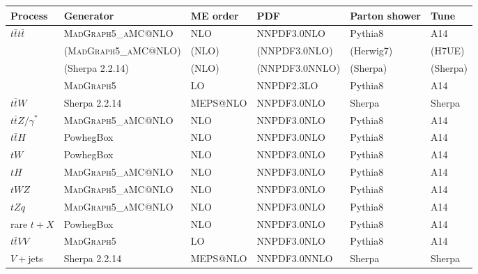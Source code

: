 \begin{table}[htbp]
\centering
\footnotesize
\setlength{\tabcolsep}{3pt}
\renewcommand{\arraystretch}{1.12}

\begin{tabular}{
p{1.6cm}
p{3.6cm}
p{1.9cm}
p{2.5cm}
p{2.0cm}
p{1.2cm}
}

\toprule
Process & Generator & ME order & PDF & Parton shower & Tune \\
\midrule

\multirow{4}{*}{$t\bar t t\bar t$}
& \textsc{MadGraph5\_aMC@NLO} & NLO & NNPDF3.0NLO & Pythia8 & A14 \\
& (\textsc{MadGraph5\_aMC@NLO}) & (NLO) & (NNPDF3.0NLO) & (Herwig7) & (H7UE) \\
& (Sherpa 2.2.14) & (NLO) & (NNPDF3.0NNLO) & (Sherpa) & (Sherpa) \\

\midrule

$t\bar t t$ & \textsc{MadGraph5} & LO & NNPDF2.3LO & Pythia8 & A14 \\

\midrule

$t\bar t W$ & Sherpa 2.2.14 & MEPS@NLO & NNPDF3.0NLO & Sherpa & Sherpa \\

$t\bar t Z/\gamma^{*}$ & \textsc{MadGraph5\_aMC@NLO} & NLO & NNPDF3.0NLO & Pythia8 & A14 \\

$t\bar t H$ & PowhegBox & NLO & NNPDF3.0NLO & Pythia8 & A14 \\

$tW$ & PowhegBox & NLO & NNPDF3.0NLO & Pythia8 & A14 \\

$tH$ & \textsc{MadGraph5\_aMC@NLO} & NLO & NNPDF3.0NLO & Pythia8 & A14 \\

$tWZ$ & \textsc{MadGraph5\_aMC@NLO} & NLO & NNPDF3.0NLO & Pythia8 & A14 \\

$tZq$ & \textsc{MadGraph5\_aMC@NLO} & NLO & NNPDF3.0NLO & Pythia8 & A14 \\

rare $t+X$ & PowhegBox & NLO & NNPDF3.0NLO & Pythia8 & A14 \\

$t\bar t VV$ & \textsc{MadGraph5} & LO & NNPDF3.0NLO & Pythia8 & A14 \\

$V+$jets & Sherpa 2.2.14 & MEPS@NLO & NNPDF3.0NNLO & Sherpa & Sherpa \\


\end{tabular}
\end{table}

